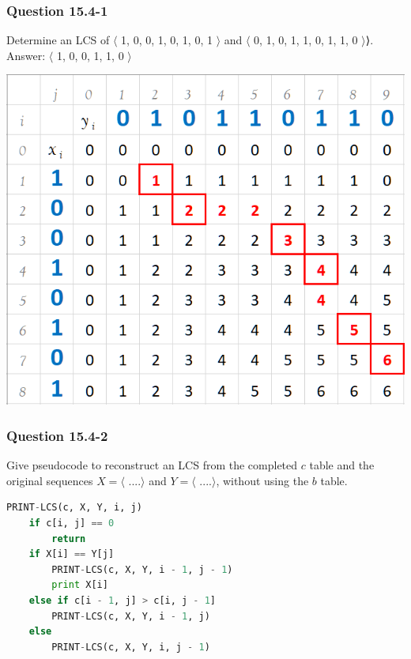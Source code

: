 \documentclass[11pt]{article}
\begin{document}
\subsubsection*{Question 15.4-1}\nointerlineskip
Determine an LCS of $\langle$ 1, 0, 0, 1, 0, 1, 0, 1 $\rangle$ and $\langle$ 0, 1, 0, 1, 1, 0, 1, 1, 0 $\rangle$⟩.\\
Answer: $\langle$ 1, 0, 0, 1, 1, 0 $\rangle$\\
\begin{center}
\includegraphics[scale=.4]{ques_LCS.png}
\end{center}

\subsubsection*{Question 15.4-2}\nointerlineskip
Give pseudocode to reconstruct an LCS from the completed $c$ table and the original sequences $X = \langle$ ....$\rangle$ and $Y = \langle$ ....$\rangle$, without using the $b$ table.\\

\begin{minipage}{6in}
\begin{lstlisting}[language=Python]
PRINT-LCS(c, X, Y, i, j)
    if c[i, j] == 0
        return
    if X[i] == Y[j]
        PRINT-LCS(c, X, Y, i - 1, j - 1)
        print X[i]
    else if c[i - 1, j] > c[i, j - 1]
        PRINT-LCS(c, X, Y, i - 1, j)
    else
        PRINT-LCS(c, X, Y, i, j - 1)
    
\end{lstlisting}
\end{minipage}
\end{document}
